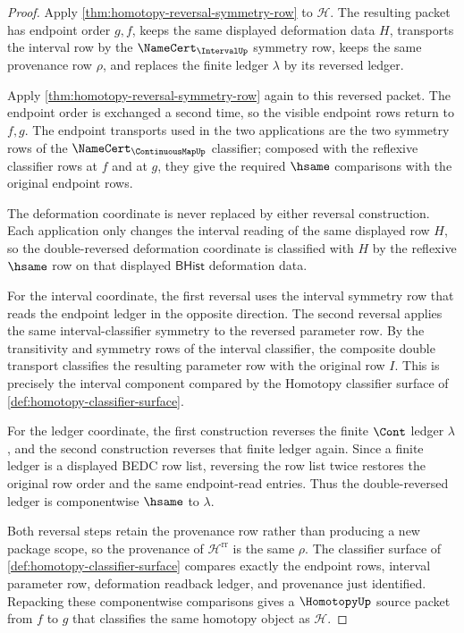 \begin{proof}
Apply \autoref{thm:homotopy-reversal-symmetry-row} to $\mathcal H$. The resulting packet has endpoint order $g,f$, keeps the same displayed deformation data $H$, transports the interval row by the $\NameCert_{\IntervalUp}$ symmetry row, keeps the same provenance row $\rho$, and replaces the finite ledger $\lambda$ by its reversed ledger.

Apply \autoref{thm:homotopy-reversal-symmetry-row} again to this reversed packet. The endpoint order is exchanged a second time, so the visible endpoint rows return to $f,g$. The endpoint transports used in the two applications are the two symmetry rows of the $\NameCert_{\ContinuousMapUp}$ classifier; composed with the reflexive classifier rows at $f$ and at $g$, they give the required $\hsame$ comparisons with the original endpoint rows.

The deformation coordinate is never replaced by either reversal construction. Each application only changes the interval reading of the same displayed row $H$, so the double-reversed deformation coordinate is classified with $H$ by the reflexive $\hsame$ row on that displayed $\mathsf{BHist}$ deformation data.

For the interval coordinate, the first reversal uses the interval symmetry row that reads the endpoint ledger in the opposite direction. The second reversal applies the same interval-classifier symmetry to the reversed parameter row. By the transitivity and symmetry rows of the interval classifier, the composite double transport classifies the resulting parameter row with the original row $I$. This is precisely the interval component compared by the Homotopy classifier surface of \autoref{def:homotopy-classifier-surface}.

For the ledger coordinate, the first construction reverses the finite $\Cont$ ledger $\lambda$, and the second construction reverses that finite ledger again. Since a finite ledger is a displayed BEDC row list, reversing the row list twice restores the original row order and the same endpoint-read entries. Thus the double-reversed ledger is componentwise $\hsame$ to $\lambda$.

Both reversal steps retain the provenance row rather than producing a new package scope, so the provenance of $\mathcal H^{\mathrm{rr}}$ is the same $\rho$. The classifier surface of \autoref{def:homotopy-classifier-surface} compares exactly the endpoint rows, interval parameter row, deformation readback ledger, and provenance just identified. Repacking these componentwise comparisons gives a $\HomotopyUp$ source packet from $f$ to $g$ that classifies the same homotopy object as $\mathcal H$.
\end{proof}

